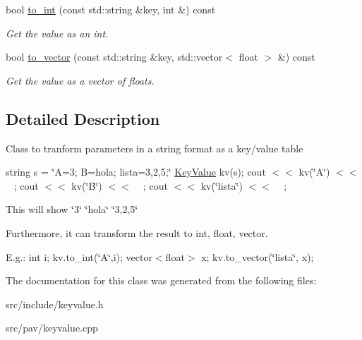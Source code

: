 \begin{DoxyCompactItemize}
\mbox{\label{classupc_1_1KeyValue_a06358658d304c3066f6d64eb350383ce}} 
bool \hyperlink{classupc_1_1KeyValue_a06358658d304c3066f6d64eb350383ce}{to\+\_\+int} (const std\+::string \&key, int \&) const
\begin{DoxyCompactList}\small\item\em Get the value as an int. \end{DoxyCompactList}\item 
\mbox{\label{classupc_1_1KeyValue_aa2f606d7ff6edd548ab3367d2e561a93}} 
bool \hyperlink{classupc_1_1KeyValue_aa2f606d7ff6edd548ab3367d2e561a93}{to\+\_\+vector} (const std\+::string \&key, std\+::vector$<$ float $>$ \&) const
\begin{DoxyCompactList}\small\item\em Get the value as a vector of floats. \end{DoxyCompactList}\end{DoxyCompactItemize}


\subsection{Detailed Description}
Class to tranform parameters in a string format as a key/value table

string s = \char`\"{}\+A=3; B=hola; lista=3,2,5;\char`\"{} \hyperlink{classupc_1_1KeyValue}{Key\+Value} kv(s); cout $<$$<$ kv(\char`\"{}\+A\char`\"{}) $<$$<$ \textquotesingle{}~\newline
\textquotesingle{}; cout $<$$<$ kv(\char`\"{}\+B\char`\"{}) $<$$<$ \textquotesingle{}~\newline
\textquotesingle{}; cout $<$$<$ kv(\char`\"{}lista\char`\"{}) $<$$<$ \textquotesingle{}~\newline
\textquotesingle{};

This will show \char`\"{}3\char`\"{} \char`\"{}hola\char`\"{} \char`\"{}3,2,5\char`\"{}

Furthermore, it can transform the result to int, float, vector.

E.\+g.\+: int i; kv.\+to\+\_\+int(\char`\"{}\+A\char`\"{},i); vector$<$float$>$ x; kv.\+to\+\_\+vector(\char`\"{}lista\char`\"{}, x); 

The documentation for this class was generated from the following files\+:\begin{DoxyCompactItemize}
\item 
src/include/keyvalue.\+h\item 
src/pav/keyvalue.\+cpp\end{DoxyCompactItemize}
